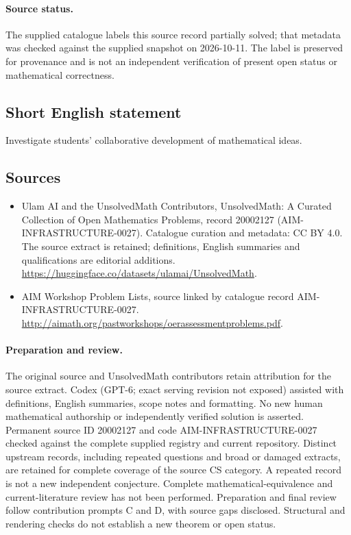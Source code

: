 \documentclass[11pt]{article}
\begin{document}
\paragraph{Source status.}
The supplied catalogue labels this source record partially solved; that metadata was checked against the supplied snapshot on 2026-10-11. The label is preserved for provenance and is not an independent verification of present open status or mathematical correctness.
\subsection{Short English statement}
Investigate students' collaborative development of mathematical ideas.
\subsection{Sources}
\begin{itemize}
\item[\hypertarget{source:20002127:1}{S1}] Ulam AI and the UnsolvedMath Contributors, UnsolvedMath: A Curated Collection of Open Mathematics Problems, record 20002127 (AIM-INFRASTRUCTURE-0027). Catalogue curation and metadata: CC BY 4.0. The source extract is retained; definitions, English summaries and qualifications are editorial additions.
\url{https://huggingface.co/datasets/ulamai/UnsolvedMath}.
\item[\hypertarget{source:20002127:2}{S2}] AIM Workshop Problem Lists, source linked by catalogue record AIM-INFRASTRUCTURE-0027.
\url{http://aimath.org/pastworkshops/oerassessmentproblems.pdf}.
\end{itemize}
\paragraph{Preparation and review.}
The original source and UnsolvedMath contributors retain attribution for the source extract. Codex (GPT-6; exact serving revision not exposed) assisted with definitions, English summaries, scope notes and formatting. No new human mathematical authorship or independently verified solution is asserted. Permanent source ID 20002127 and code AIM-INFRASTRUCTURE-0027 checked against the complete supplied registry and current repository. Distinct upstream records, including repeated questions and broad or damaged extracts, are retained for complete coverage of the source CS category. A repeated record is not a new independent conjecture. Complete mathematical-equivalence and current-literature review has not been performed. Preparation and final review follow contribution prompts C and D, with source gaps disclosed. Structural and rendering checks do not establish a new theorem or open status.
\label{end:20002127}
\end{document}
